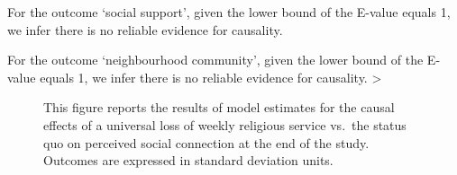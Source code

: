 \documentclass[
  single column]{article}
\begin{document}
For the outcome `social support', given the lower bound of the E-value
equals 1, we infer there is no reliable evidence for causality.

For the outcome `neighbourhood community', given the lower bound of the
E-value equals 1, we infer there is no reliable evidence for causality.
\textgreater{}

\newpage{}

\begin{figure}


\caption{\label{fig-2_3}This figure reports the results of model
estimates for the causal effects of a universal loss of weekly religious
service vs.~the status quo on perceived social connection at the end of
the study. Outcomes are expressed in standard deviation units.}

\end{figure}%
\end{document}
